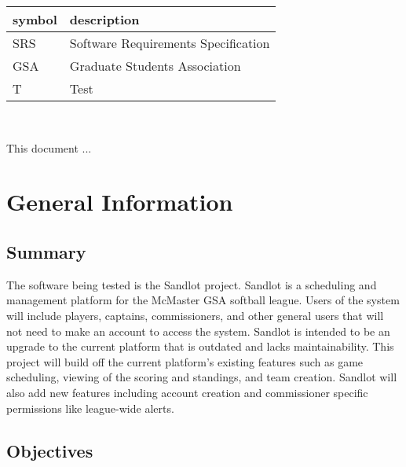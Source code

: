 \documentclass[12pt, titlepage]{article}
\begin{document}
\renewcommand{\arraystretch}{1.2}
\begin{tabular}{l l} 
  \toprule		
  \textbf{symbol} & \textbf{description}\\
  \midrule 
  SRS & Software Requirements Specification\\
  GSA & Graduate Students Association\\
  T & Test\\
  \bottomrule
\end{tabular}\\



\newpage


This document ... 

\section{General Information}

\subsection{Summary}


The software being tested is the Sandlot project. Sandlot is a scheduling and
management platform for the McMaster GSA softball league. Users of the system
will include players, captains, commissioners, and other general users that will
not need to make an account to access the system. Sandlot is intended to be an
upgrade to the current platform that is outdated and lacks maintainability. This
project will build off the current platform's existing features such as game
scheduling, viewing of the scoring and standings, and team creation. Sandlot will
also add new features including account creation and commissioner specific
permissions like league-wide alerts.

\subsection{Objectives}
\end{document}
